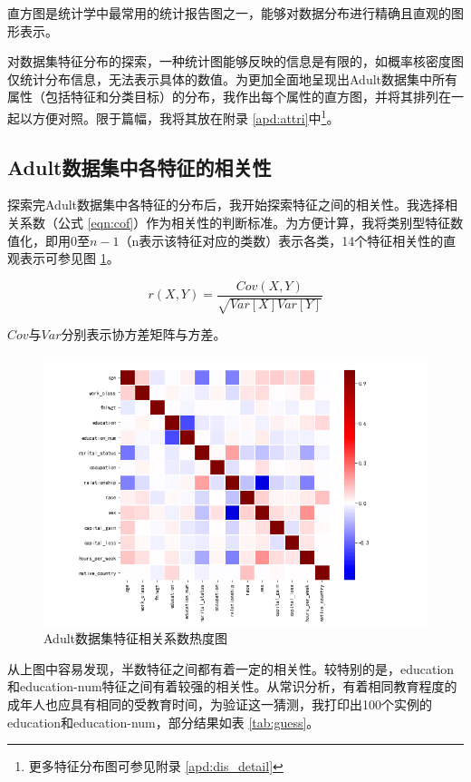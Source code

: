 \documentclass[12pt,a4paper]{article}
\theoremstyle{definition}
\begin{document}
直方图是统计学中最常用的统计报告图之一，能够对数据分布进行精确且直观的图形表示。

\vspace{0.01\linewidth}
对数据集特征分布的探索，一种统计图能够反映的信息是有限的，如概率核密度图仅统计分布信息，无法表示具体的数值。为更加全面地呈现出Adult数据集中所有属性（包括特征和分类目标）的分布，我作出每个属性的直方图，并将其排列在一起以方便对照。限于篇幅，我将其放在附录 \ref{apd:attri}中\footnote{更多特征分布图可参见附录 \ref{apd:dis_detail}}。

\subsection{Adult数据集中各特征的相关性}
\label{sec:cof}

探索完Adult数据集中各特征的分布后，我开始探索特征之间的相关性。我选择相关系数（公式 \ref{eqn:cof}）作为相关性的判断标准。为方便计算，我将类别型特征数值化，即用0至$n-1$（n表示该特征对应的类数）表示各类，14个特征相关性的直观表示可参见图 \ref{fig:heat}。

\begin{equation}
	\label{eqn:cof}
	r(X, Y) = \dfrac{Cov(X, Y)}{\sqrt{Var[X]Var[Y]}}
\end{equation}

$Cov$与$Var$分别表示协方差矩阵与方差。

\begin{figure}[H]
	\centering
	\includegraphics[width=0.85\linewidth]{img/cof_heat.png}
	\caption{Adult数据集特征相关系数热度图}
	\label{fig:heat}
\end{figure}

从上图中容易发现，半数特征之间都有着一定的相关性。较特别的是，education和education-num特征之间有着较强的相关性。从常识分析，有着相同教育程度的成年人也应具有相同的受教育时间，为验证这一猜测，我打印出100个实例的education和education-num，部分结果如表 \ref{tab:guess}。
\end{document}
